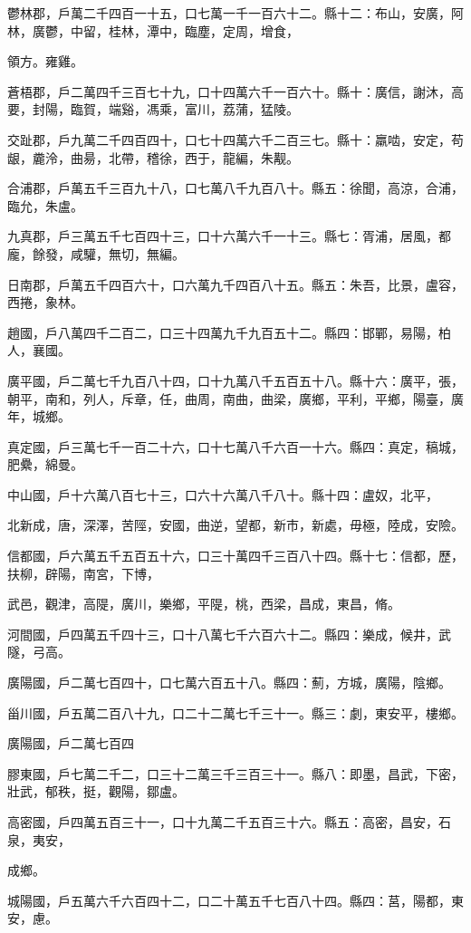 \begin{pinyinscope}
鬱林郡，戶萬二千四百一十五，口七萬一千一百六十二。縣十二：布山，安廣，阿林，廣鬱，中留，桂林，潭中，臨塵，定周，增食，

領方。雍雞。

蒼梧郡，戶二萬四千三百七十九，口十四萬六千一百六十。縣十：廣信，謝沐，高要，封陽，臨賀，端谿，馮乘，富川，荔蒲，猛陵。

交趾郡，戶九萬二千四百四十，口七十四萬六千二百三七。縣十：羸啮，安定，苟龈，麊泠，曲昜，北帶，稽徐，西于，龍編，朱觏。

合浦郡，戶萬五千三百九十八，口七萬八千九百八十。縣五：徐聞，高涼，合浦，臨允，朱盧。

九真郡，戶三萬五千七百四十三，口十六萬六千一十三。縣七：胥浦，居風，都龐，餘發，咸驩，無切，無編。

日南郡，戶萬五千四百六十，口六萬九千四百八十五。縣五：朱吾，比景，盧容，西捲，象林。

趙國，戶八萬四千二百二，口三十四萬九千九百五十二。縣四：邯鄲，易陽，柏人，襄國。

廣平國，戶二萬七千九百八十四，口十九萬八千五百五十八。縣十六：廣平，張，朝平，南和，列人，斥章，任，曲周，南曲，曲梁，廣鄉，平利，平鄉，陽臺，廣年，城鄉。

真定國，戶三萬七千一百二十六，口十七萬八千六百一十六。縣四：真定，稿城，肥纍，綿曼。

中山國，戶十六萬八百七十三，口六十六萬八千八十。縣十四：盧奴，北平，

北新成，唐，深澤，苦陘，安國，曲逆，望都，新市，新處，毋極，陸成，安險。

信都國，戶六萬五千五百五十六，口三十萬四千三百八十四。縣十七：信都，歷，扶柳，辟陽，南宮，下博，

武邑，觀津，高隄，廣川，樂鄉，平隄，桃，西梁，昌成，東昌，脩。

河間國，戶四萬五千四十三，口十八萬七千六百六十二。縣四：樂成，候井，武隧，弓高。

廣陽國，戶二萬七百四十，口七萬六百五十八。縣四：薊，方城，廣陽，陰鄉。

甾川國，戶五萬二百八十九，口二十二萬七千三十一。縣三：劇，東安平，樓鄉。

廣陽國，戶二萬七百四

膠東國，戶七萬二千二，口三十二萬三千三百三十一。縣八：即墨，昌武，下密，壯武，郁秩，挺，觀陽，鄒盧。

高密國，戶四萬五百三十一，口十九萬二千五百三十六。縣五：高密，昌安，石泉，夷安，

成鄉。

城陽國，戶五萬六千六百四十二，口二十萬五千七百八十四。縣四：莒，陽都，東安，慮。


\end{pinyinscope}
